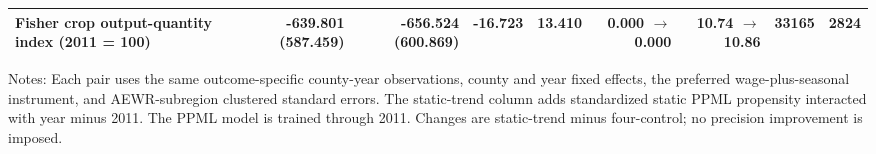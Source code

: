 \begin{table}[htbp]
{\begin{tabular}{lrrrrrrrr}
Fisher crop output-quantity index (2011 = 100) & -639.801 (587.459) & -656.524 (600.869) & -16.723 & 13.410 & 0.000 $\rightarrow$ 0.000 & 10.74 $\rightarrow$ 10.86 & 33165 & 2824 \\
\hline\hline
\end{tabular}%
}
\begin{minipage}{0.98\textwidth}\footnotesize Notes: Each pair uses the same outcome-specific county-year observations, county and year fixed effects, the preferred wage-plus-seasonal instrument, and AEWR-subregion clustered standard errors. The static-trend column adds standardized static PPML propensity interacted with year minus 2011. The PPML model is trained through 2011. Changes are static-trend minus four-control; no precision improvement is imposed.\end{minipage}
\end{table}
